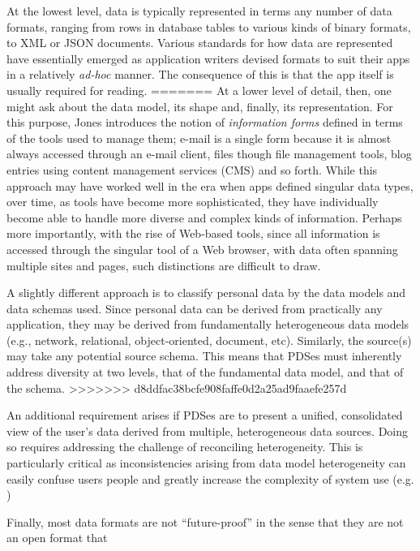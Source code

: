 \documentclass[runningheads,a4paper]{llncs}
\begin{document}
At the lowest level, data is typically represented in terms any number of data formats, ranging from rows in database tables to various kinds of binary formats, to XML or JSON documents.  Various standards for how data are represented have essentially emerged as application writers devised formats to suit their apps in a relatively \emph{ad-hoc} manner.  The consequence of this is that the app itself is usually required for reading.
=======
At a lower level of detail, then, one might ask about the data model, its shape and, finally, its representation.  For this purpose, Jones introduces the notion of \emph{information forms} defined in terms of the tools used to manage them; e-mail is a single form because it is almost always accessed through an e-mail client, files though file management tools, blog entries using content management services (CMS) and so forth.  While this approach may have worked well in the era when apps defined singular data types, over time, as tools have become more sophisticated, they have individually become  able to handle more diverse and complex kinds of information.  Perhaps more importantly, with the rise of Web-based tools, since all information is accessed through the singular tool of a Web browser, with data often spanning multiple sites and pages, such distinctions are difficult to draw.

A slightly different approach is to classify personal data by the data models and data schemas used.  Since personal data can be derived from practically any application, they may be derived from fundamentally heterogeneous data models (e.g., network, relational, object-oriented, document, etc). Similarly, the source(s) may take any potential source schema.  This means that PDSes must inherently address diversity at two levels, that of the fundamental data model, and that of the schema.
>>>>>>> d8ddfac38bcfe908faffe0d2a25ad9faaefe257d

An additional requirement arises if PDSes are to present a unified, consolidated view of the user's data derived from multiple, heterogeneous data sources. Doing so requires addressing the challenge of reconciling heterogeneity.  This is particularly critical as inconsistencies arising from data model heterogeneity can easily confuse users people and greatly increase the complexity of system use (e.g. \cite{})

Finally, most data formats are not ``future-proof'' in the sense that they are not an open format that 


\end{document}
